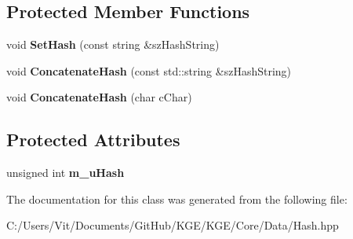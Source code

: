 \subsection*{Protected Member Functions}
\begin{DoxyCompactItemize}
\item 
\hypertarget{class_k_g_e_1_1_hash_a7cdf41c18270d407c24ee113e6ba3ce1}{void {\bfseries Set\-Hash} (const string \&sz\-Hash\-String)}\label{class_k_g_e_1_1_hash_a7cdf41c18270d407c24ee113e6ba3ce1}

\item 
\hypertarget{class_k_g_e_1_1_hash_aa2e106049f750ccc822cf7f25f129fd0}{void {\bfseries Concatenate\-Hash} (const std\-::string \&sz\-Hash\-String)}\label{class_k_g_e_1_1_hash_aa2e106049f750ccc822cf7f25f129fd0}

\item 
\hypertarget{class_k_g_e_1_1_hash_a93caac41c8742403562c9e7f4fa34f9f}{void {\bfseries Concatenate\-Hash} (char c\-Char)}\label{class_k_g_e_1_1_hash_a93caac41c8742403562c9e7f4fa34f9f}

\end{DoxyCompactItemize}
\subsection*{Protected Attributes}
\begin{DoxyCompactItemize}
\item 
\hypertarget{class_k_g_e_1_1_hash_a7f69224148adb995aed2eff1e5ba9f29}{unsigned int {\bfseries m\-\_\-u\-Hash}}\label{class_k_g_e_1_1_hash_a7f69224148adb995aed2eff1e5ba9f29}

\end{DoxyCompactItemize}


The documentation for this class was generated from the following file\-:\begin{DoxyCompactItemize}
\item 
C\-:/\-Users/\-Vit/\-Documents/\-Git\-Hub/\-K\-G\-E/\-K\-G\-E/\-Core/\-Data/Hash.\-hpp\end{DoxyCompactItemize}
